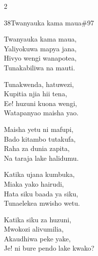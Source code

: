 \documentclass{article}
\begin{document}
\begin{multicols}{2}
\begin{hymn}{38}{Twanyauka kama maua}{\#97}
\begin{stanza}
Twanyauka kama maua,\\
Yaliyokuwa mapya jana,\\
Hivyo wengi wanapotea,\\
Tunakabiliwa na mauti.
\end{stanza}
\begin{chorus}
Tunakwenda, hatuwezi,\\
Kupitia njia hii tena,\\
Ee! huzuni kuona wengi,\\
Watapanyao maisha yao.
\end{chorus}
\begin{stanza}
Maisha yetu ni mafupi,\\
Bado kitambo tutakufa,\\
Raha za dunia zapita,\\
Na taraja lake halidumu.
\end{stanza}
\begin{stanza}
Katika ujana kumbuka,\\
Miaka yako hairudi,\\
Hata siku baada ya siku,\\
Tunaelekea mwisho wetu.
\end{stanza}
\begin{stanza}
Katika siku za huzuni,\\
Mwokozi alivumilia,\\
Akaudhiwa peke yake,\\
Je! ni bure pendo lake kwako?
\end{stanza}
\end{hymn}


\end{multicols}
\end{document}
